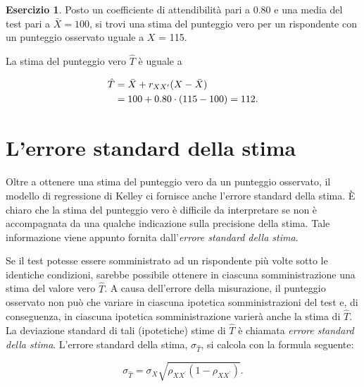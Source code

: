 \documentclass[
  11pt,
]{krantz}
\theoremstyle{definition}
\theoremstyle{definition}
\theoremstyle{definition}
\newtheorem{exercise}{Esercizio}[chapter]
\theoremstyle{definition}
\theoremstyle{remark}
\begin{document}
\begin{exercise}
Posto un coefficiente di attendibilità pari a 0.80 e una media del test pari a \(\bar{X} = 100\), si trovi una stima del punteggio vero per un rispondente con un punteggio osservato uguale a \(X\) = 115.

La stima del punteggio vero \(\hat{T}\) è uguale a

\begin{equation}
\begin{aligned}
\hat{T} &= \bar{X} + r_{XX^\prime}  (X - \bar{X})\notag\\
&= 100 + 0.80 \cdot (115 - 100) = 112.
\end{aligned}
\end{equation}
\end{exercise}

\hypertarget{lerrore-standard-della-stima}{%
\section{L'errore standard della stima}\label{lerrore-standard-della-stima}}

Oltre a ottenere una stima del punteggio vero da un punteggio osservato, il modello di regressione di Kelley ci fornisce anche l'errore standard della stima. È chiaro che la stima del punteggio vero è difficile da interpretare se non è accompagnata da una qualche indicazione sulla precisione della stima. Tale informazione viene appunto fornita dall'\emph{errore standard della stima}.

Se il test potesse essere somministrato ad un rispondente più volte sotto le identiche condizioni, sarebbe possibile ottenere in ciascuna somministrazione una stima del valore vero \(\hat{T}\). A causa dell'errore della misurazione, il punteggio osservato non può che variare in ciascuna ipotetica somministrazioni del test e, di conseguenza, in ciascuna ipotetica somministrazione varierà anche la stima di \(\hat{T}\). La deviazione standard di tali (ipotetiche) stime di \(\hat{T}\) è chiamata \emph{errore standard della stima}. L'errore standard della stima, \(\sigma_{\hat{T}}\), si calcola con la formula seguente:

\begin{equation}
\sigma_{\hat{T}} = \sigma_X \sqrt{\rho_{XX^\prime} (1 -\rho_{XX^\prime})}.
\label{eq:bistd-err-estimatenom}
\end{equation}
\end{document}
